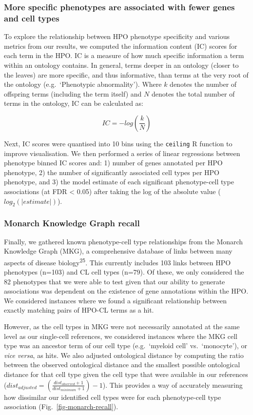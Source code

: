\documentclass[
]{article}
\begin{document}
\subsubsection{More specific phenotypes are associated with fewer genes
and cell
types}\label{more-specific-phenotypes-are-associated-with-fewer-genes-and-cell-types-1}

To explore the relationship between HPO phenotype specificity and
various metrics from our results, we computed the information content
(IC) scores for each term in the HPO. IC is a measure of how much
specific information a term within an ontology contains. In general,
terms deeper in an ontology (closer to the leaves) are more specific,
and thus informative, than terms at the very root of the ontology
(e.g.~`Phenotypic abnormality'). Where \(k\) denotes the number of
offspring terms (including the term itself) and \(N\) denotes the total
number of terms in the ontology, IC can be calculated as:

\[
IC=-log(\frac{k}{N})
\]

Next, IC scores were quantised into 10 bins using the \texttt{ceiling} R
function to improve visualisation. We then performed a series of linear
regressions between phenotype binned IC scores and: 1) number of genes
annotated per HPO phenotype, 2) the number of significantly associated
cell types per HPO phenotype, and 3) the model estimate of each
significant phenotype-cell type associations (at FDR \textless{} 0.05)
after taking the log of the absolute value (\(log_2(|estimate|)\)).

\subsubsection{Monarch Knowledge Graph
recall}\label{monarch-knowledge-graph-recall}

Finally, we gathered known phenotype-cell type relationships from the
Monarch Knowledge Graph (MKG), a comprehensive database of links between
many aspects of disease biology\textsuperscript{25}. This currently
includes 103 links between HPO phenotypes (n=103) and CL cell types
(n=79). Of these, we only considered the 82 phenotypes that we were able
to test given that our ability to generate associations was dependent on
the existence of gene annotations within the HPO. We considered
instances where we found a significant relationship between exactly
matching pairs of HPO-CL terms as a hit.

However, as the cell types in MKG were not necessarily annotated at the
same level as our single-cell references, we considered instances where
the MKG cell type was an ancestor term of our cell type (e.g.~`myeloid
cell' vs.~`monocyte'), or \emph{vice versa}, as hits. We also adjusted
ontological distance by computing the ratio between the observed
ontological distance and the smallest possible ontological distance for
that cell type given the cell type that were available in our references
(\(dist_{adjusted}=(\frac{dist_{observed}+1}{dist_{minimum}+1})-1\)).
This provides a way of accurately measuring how dissimilar our
identified cell types were for each phenotype-cell type association
(Fig.~\ref{fig-monarch-recall}).
\end{document}
